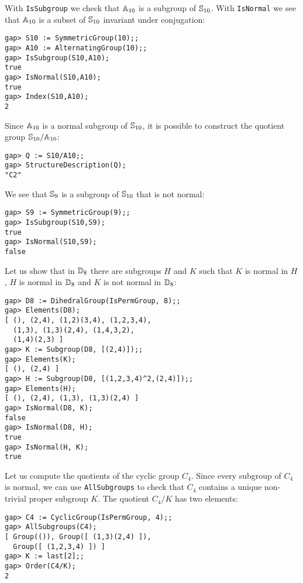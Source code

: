 \begin{example}
With \lstinline{IsSubgroup} we check that $\mathbb{A}_{10}$ is a subgroup of 
$\mathbb{S}_{10}$. With \lstinline{IsNormal} we see that 
$\mathbb{A}_{10}$ is a subset of $\mathbb{S}_{10}$ invariant 
under conjugation:
\begin{lstlisting}
gap> S10 := SymmetricGroup(10);;
gap> A10 := AlternatingGroup(10);;
gap> IsSubgroup(S10,A10);
true
gap> IsNormal(S10,A10);
true
gap> Index(S10,A10);
2
\end{lstlisting}
Since $\mathbb{A}_{10}$ is a normal subgroup of $\mathbb{S}_{10}$, 
it is possible to construct the quotient group
$\mathbb{S}_{10}/\mathbb{A}_{10}$:
\begin{lstlisting}
gap> Q := S10/A10;;
gap> StructureDescription(Q);
"C2"
\end{lstlisting}
We see that $\mathbb{S}_9$ is a subgroup of $\mathbb{S}_{10}$ that
is not normal:
\begin{lstlisting}
gap> S9 := SymmetricGroup(9);;
gap> IsSubgroup(S10,S9);
true
gap> IsNormal(S10,S9);
false
\end{lstlisting}
\end{example}

\begin{example}
Let us show that in $\mathbb{D}_8$ there are subgroups $H$ and $K$ such that $K$ is
normal in $H$, $H$ is normal in $\mathbb{D}_8$ and $K$ is not normal in $\mathbb{D}_8$: 
\begin{lstlisting}
gap> D8 := DihedralGroup(IsPermGroup, 8);;
gap> Elements(D8);
[ (), (2,4), (1,2)(3,4), (1,2,3,4), 
  (1,3), (1,3)(2,4), (1,4,3,2), 
  (1,4)(2,3) ]
gap> K := Subgroup(D8, [(2,4)]);;
gap> Elements(K);
[ (), (2,4) ]
gap> H := Subgroup(D8, [(1,2,3,4)^2,(2,4)]);;
gap> Elements(H);
[ (), (2,4), (1,3), (1,3)(2,4) ]
gap> IsNormal(D8, K);
false
gap> IsNormal(D8, H);
true
gap> IsNormal(H, K);
true
\end{lstlisting}
\end{example}

\begin{example}
Let us compute the quotients of the cyclic group $C_4$. Since every subgroup of
$C_4$ is normal, we can use \lstinline{AllSubgroups} to check that $C_4$
contains a unique non-trivial proper subgroup $K$. The quotient $C_4/K$ has two
elements: 
\begin{lstlisting}
gap> C4 := CyclicGroup(IsPermGroup, 4);;
gap> AllSubgroups(C4);
[ Group(()), Group([ (1,3)(2,4) ]), 
  Group([ (1,2,3,4) ]) ]
gap> K := last[2];;
gap> Order(C4/K);
2
\end{lstlisting}
\end{example}

